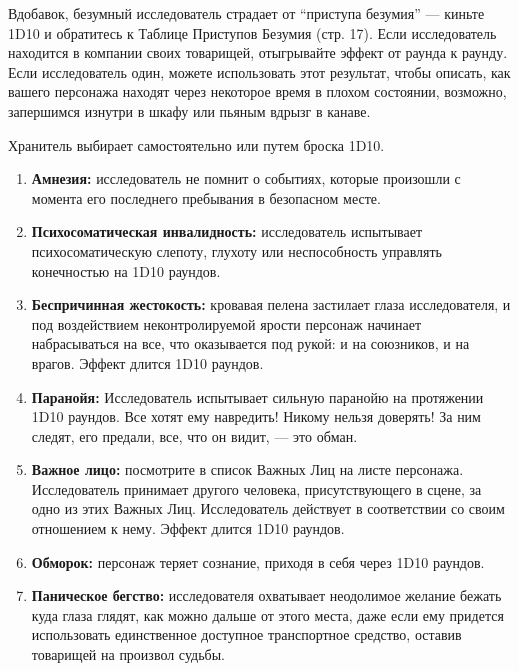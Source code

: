 \documentclass[letterpaper,twocolumn,openany, twoside, 11pt, usenames]{cocbook}
\begin{document}
Вдобавок, безумный исследователь страдает от ``приступа безумия'' --- киньте 1D10 и обратитесь к Таблице Приступов Безумия (стр. 17). Если исследователь находится в компании своих товарищей, отыгрывайте эффект от раунда к раунду. Если исследователь один, можете использовать этот результат, чтобы описать, как вашего персонажа находят через некоторое время в плохом состоянии, возможно, запершимся изнутри в шкафу или пьяным вдрызг в канаве.
\begin{fullcocpaperbox}{}{}
  Хранитель выбирает самостоятельно или путем броска 1D10.
  \begin{multicols}{2}
  \begin{enumerate}
    \item \textbf{Амнезия:} исследователь не помнит о событиях, которые произошли с момента его последнего пребывания в безопасном месте.
    \item \textbf{Психосоматическая инвалидность:} исследователь испытывает психосоматическую слепоту, глухоту или неспособность управлять конечностью на 1D10 раундов.
    \item \textbf{Беспричинная жестокость:} кровавая пелена застилает глаза исследователя, и под воздействием неконтролируемой ярости персонаж начинает набрасываться на все, что оказывается под рукой: и на союзников, и на врагов. Эффект длится 1D10 раундов.
    \item \textbf{Паранойя:} Исследователь испытывает сильную паранойю на протяжении 1D10 раундов. Все хотят ему навредить! Никому нельзя доверять! За ним следят, его предали, все, что он видит, --- это обман.
    \item \textbf{Важное лицо:} посмотрите в список Важных Лиц на листе персонажа. Исследователь принимает другого человека, присутствующего в сцене, за одно из этих Важных Лиц. Исследователь действует в соответствии со своим отношением к нему. Эффект длится 1D10 раундов.
    \item \textbf{Обморок:} персонаж теряет сознание, приходя в себя через 1D10 раундов.
    \item \textbf{Паническое бегство:} исследователя охватывает неодолимое желание бежать куда глаза глядят, как можно дальше от этого места, даже если ему придется использовать единственное доступное транспортное средство, оставив товарищей на произвол судьбы.

\end{enumerate}
\end{multicols}
\end{fullcocpaperbox}
\end{document}
